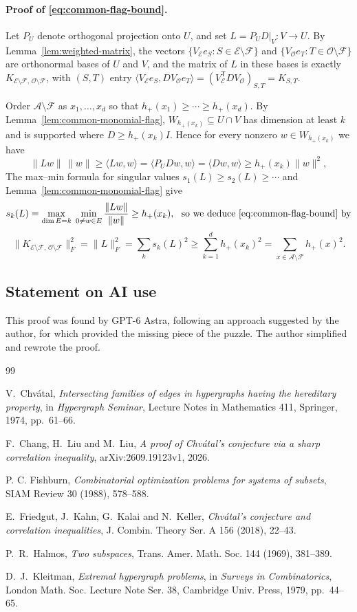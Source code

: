 \documentclass{article}
\theoremstyle{plain}
\theoremstyle{definition}
\newcommand{\mc}[1]{\mathcal{#1}}
\newcommand{\sub}{\subseteq}
\newcommand{\sm}{\setminus}
\begin{document}
\paragraph{Proof of \eqref{eq:common-flag-bound}.}
Let $P_U$ denote orthogonal projection onto $U$, and set $L=P_UD|_V:V\to U$.  By Lemma~\ref{lem:weighted-matrix}, the vectors $\{V_{\mc E}e_S:S\in\mc E\sm\mc F\}$ and $\{V_{\mc O}e_T:T\in\mc O\sm\mc F\}$ are orthonormal bases of $U$ and $V$, and the matrix of $L$ in these bases is exactly
\(K_{\mc E\sm\mc F,\,\mc O\sm\mc F}\), with $(S,T)$ entry 
\(
 \langle V_{\mc E}e_S,DV_{\mc O}e_T\rangle
 =(V_{\mc E}^{\mathsf T}DV_{\mc O})_{S,T}=K_{S,T}.
\)

Order $\mc A\sm\mc F$ as $x_1,\ldots,x_d$ so that
$h_+(x_1)\ge\cdots\ge h_+(x_d)$.  By Lemma~\ref{lem:common-monomial-flag},
$W_{h_+(x_k)}\sub U\cap V$ has dimension at least $k$ and is supported where $D\ge h_+(x_k)I$.  
Hence for every nonzero $w\in W_{h_+(x_k)}$ we have
\[
 \|Lw\|\,\|w\|\ge\langle Lw,w\rangle
 =\langle P_UDw,w\rangle
 =\langle Dw,w\rangle
 \ge h_+(x_k)\|w\|^2,
\]
The max--min formula for singular values $s_1(L)\ge s_2(L)\ge\cdots$ and Lemma~\ref{lem:common-monomial-flag} give
\[
 s_k(L)=\max_{\dim E=k}\;\min_{0\ne w\in E}\frac{\|Lw\|}{\|w\|} \ge h_+(x_k), 
 \ \text{ so we deduce \eqref{eq:common-flag-bound} by}
\]
\[
 \|K_{\mc E\sm\mc F,\,\mc O\sm\mc F}\|_F^2
 =\|L\|_F^2
 =\sum_k s_k(L)^2
 \ge\sum_{k=1}^d h_+(x_k)^2
 =\sum_{x\in\mc A\sm\mc F}h_+(x)^2.
\]

\subsection*{Statement on AI use}

This proof was found by GPT-6 Astra, following an approach suggested by the author,
for which \cite{CLL} provided the missing piece of the puzzle.
The author simplified and rewrote the proof.

\begin{thebibliography}{99}

V.~Chv\'atal,
\emph{Intersecting families of edges in hypergraphs having the hereditary property},
in \emph{Hypergraph Seminar}, Lecture Notes in Mathematics 411, Springer, 1974, pp.~61--66.

F.~Chang, H.~Liu and M.~Liu,
\emph{A proof of Chv\'atal's conjecture via a sharp correlation inequality},
arXiv:2609.19123v1, 2026.

 P. C. Fishburn, 
\emph{Combinatorial optimization problems for systems of subsets}, 
SIAM Review 30 (1988), 578--588.

E.~Friedgut, J.~Kahn, G.~Kalai and N.~Keller,
\emph{Chv\'atal's conjecture and correlation inequalities},
J. Combin. Theory Ser. A 156 (2018), 22--43.

P.~R.~Halmos,
\emph{Two subspaces},
Trans. Amer. Math. Soc. 144 (1969), 381--389.

D.~J.~Kleitman,
\emph{Extremal hypergraph problems},
in \emph{Surveys in Combinatorics}, London Math. Soc. Lecture Note Ser. 38, Cambridge Univ. Press, 1979, pp.~44--65.

\end{thebibliography}
\end{document}
